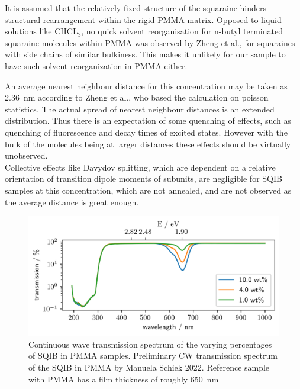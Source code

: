 \documentclass[twoside,openright,listof=numbered]{scrreprt}
\begin{document}
It is assumed that the relatively fixed structure of the squaraine hinders structural rearrangement within the rigid PMMA matrix.
Opposed to liquid solutions like $\mathrm{CHCL_3}$, no quick solvent reorganisation for n-butyl terminated squaraine molecules within PMMA was observed by Zheng et al.\cite{Zheng2020}, for squaraines with side chains of similar bulkiness. This makes it unlikely for our sample to have such solvent reorganization in PMMA either.

An average nearest neighbour distance for this concentration may be taken as \SI{2.36}{\nano\meter} according to Zheng et al.\cite{Zheng2020}, who based the calculation on poisson statistics\cite{Krider2003}. The actual spread of nearest neighbour distances is an extended distribution. Thus there is an expectation of some quenching of effects, such as quenching of fluorescence and decay times of excited states. However with the bulk of the molecules being at larger distances these effects should be virtually unobserved.\cite{Zheng2020} \\
Collective effects like Davydov splitting, which are dependent on a relative orientation of transition dipole moments of subunits, are negligible for SQIB samples at this concentration, which are not annealed, and are not observed as the average distance is great enough.\\

\begin{figure}[!htp]
\centering
\includegraphics[scale = 1]{images/SQIB_VarPercentInPMMA_transmission.png}
\caption[Continuous wave transmission spectrum of the varying percentages of SQIB in PMMA samples.]{Continuous wave transmission spectrum of the varying percentages of SQIB in PMMA samples.\label{fig:VarpercentCWspectrum} Preliminary CW transmission spectrum of the SQIB in PMMA by Manuela Schiek 2022.\cite{Schiek2022} Reference sample with PMMA has a film thickness of roughly \SI{650}{\nano\meter}}
\end{figure}
\end{document}
